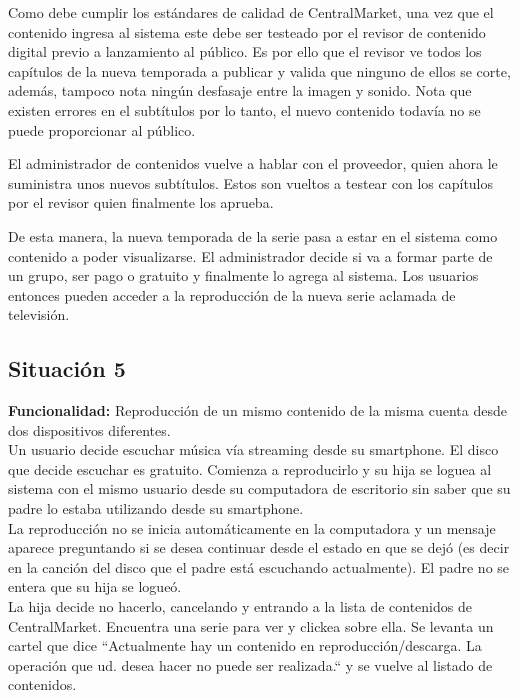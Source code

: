 \documentclass[11pt, a4paper, spanish]{article}
\begin{document}
        Como debe cumplir los est\'andares de calidad de CentralMarket, una vez que el contenido ingresa al sistema este debe ser testeado por el revisor 
   de contenido digital previo a lanzamiento al p\'ublico. Es por ello que el revisor ve todos los cap\'itulos de la nueva temporada a publicar y valida 
   que ninguno de ellos se corte, adem\'as, tampoco nota ning\'un desfasaje entre la imagen y sonido. Nota que existen errores en el subt\'itulos por lo 
   tanto, el nuevo contenido todav\'ia no se puede proporcionar al p\'ublico.
   
      El administrador de contenidos vuelve a hablar con el proveedor, quien ahora le suministra unos nuevos subt\'itulos. Estos son vueltos a testear 
   con los cap\'itulos por el revisor quien finalmente los aprueba.

      De esta manera, la nueva temporada de la serie pasa a estar en el sistema como contenido a poder visualizarse. El administrador decide si va a    
   formar parte de un grupo, ser pago o gratuito y finalmente lo agrega al sistema.
   Los usuarios entonces pueden acceder a la reproducci\'on de la nueva serie aclamada de televisi\'on.

\subsection{Situaci\'on 5}

	\textbf{Funcionalidad:} Reproducci\'on de un mismo contenido de la misma cuenta desde dos dispositivos diferentes.\\

      Un usuario decide escuchar m\'usica v\'ia streaming desde su smartphone. El disco que decide escuchar es gratuito. Comienza a reproducirlo y su hija 
   se loguea al sistema con el mismo usuario desde su computadora de escritorio sin saber que su padre lo estaba utilizando desde su smartphone.\\

      La reproducci\'on no se inicia autom\'aticamente en la computadora y un mensaje aparece preguntando si se desea continuar desde el estado en que se   
   dej\'o (es decir en la canci\'on del disco que el padre est\'a escuchando actualmente). El padre no se entera que su hija se logue\'o.\\

      La hija decide no hacerlo, cancelando y entrando a la lista de contenidos de CentralMarket. Encuentra una serie para ver y clickea sobre ella. Se 
   levanta un cartel que dice ``Actualmente hay un contenido en reproducci\'on/descarga. La operaci\'on que ud. desea hacer no puede ser realizada.`` 	  y se vuelve al listado de contenidos.
\end{document}
